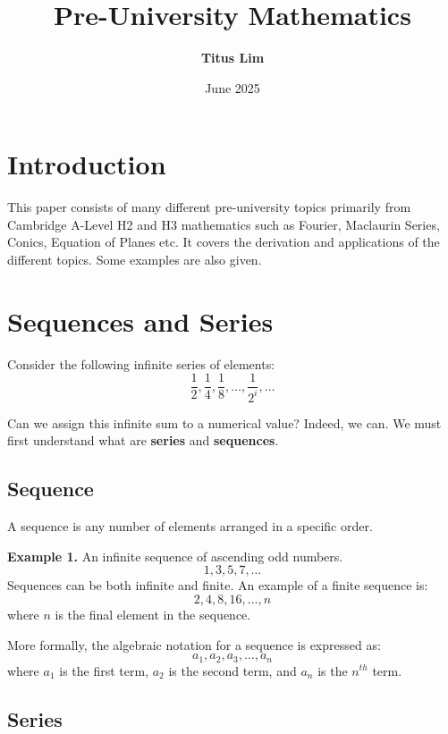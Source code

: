 \documentclass[12pt]{article}
\title{Pre-University Mathematics}
\author{\textbf{Titus Lim}}
\date{June 2025}
\begin{document}
\begin{titlingpage}
	\maketitle
\end{titlingpage}

\tableofcontents
\newpage

\section*{Introduction}

This paper consists of many different pre-university topics primarily from Cambridge A-Level H2 and H3 mathematics such as Fourier, Maclaurin Series, Conics, Equation of Planes etc.
It covers the derivation and applications of the different topics. Some examples are also given.

\section{Sequences and Series}

Consider the following infinite series of elements:
\[
	\frac{1}{2}, \frac{1}{4}, \frac{1}{8},\dots,\frac{1}{2^{i}},\dots
\]

Can we assign this infinite sum to a numerical value? Indeed, we can. We must first understand what are \textbf{series} and \textbf{sequences}.

\subsection{Sequence}

A sequence is any number of elements arranged in a specific order.

\textbf{Example 1.} An infinite sequence of ascending odd numbers.
\[
	1, 3, 5, 7, \dots
\]
Sequences can be both infinite and finite. An example of a finite sequence is:
\[
	2, 4, 8, 16, \dots, n
\]
where $n$ is the final element in the sequence.

More formally, the algebraic notation for a sequence is expressed as:
\[
	a_1, a_2, a_3, \dots, a_n
\]
where $a_1$ is the first term, $a_2$ is the second term, and $a_n$ is the $n^{th}$ term.

\subsection{Series}
\end{document}
